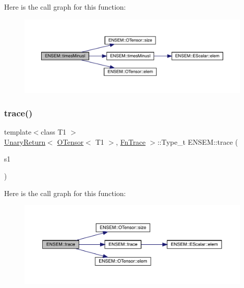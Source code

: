 Here is the call graph for this function\+:\nopagebreak
\begin{figure}[H]
\begin{center}
\leavevmode
\includegraphics[width=350pt]{de/d87/group__obstensor_ga2ff1b1b26805ce37116135e8474f4b36_cgraph}
\end{center}
\end{figure}
\mbox{\label{group__obstensor_gade63bf28037560bb8bb80db95b64eacf}} 
\subsubsection{\texorpdfstring{trace()}{trace()}}
{\footnotesize\ttfamily template$<$class T1 $>$ \\
\mbox{\hyperlink{structENSEM_1_1UnaryReturn}{Unary\+Return}}$<$ \mbox{\hyperlink{classENSEM_1_1OTensor}{O\+Tensor}}$<$ T1 $>$, \mbox{\hyperlink{structENSEM_1_1FnTrace}{Fn\+Trace}} $>$\+::Type\+\_\+t E\+N\+S\+E\+M\+::trace (\begin{DoxyParamCaption}\item[{const \mbox{\hyperlink{classENSEM_1_1OTensor}{O\+Tensor}}$<$ T1 $>$ \&}]{s1 }\end{DoxyParamCaption})\hspace{0.3cm}{\ttfamily [inline]}}

Here is the call graph for this function\+:\nopagebreak
\begin{figure}[H]
\begin{center}
\leavevmode
\includegraphics[width=350pt]{de/d87/group__obstensor_gade63bf28037560bb8bb80db95b64eacf_cgraph}
\end{center}
\end{figure}
\mbox{\label{group__obstensor_gab134dab9b5acf4d2d372b22d17d4b307}} 
